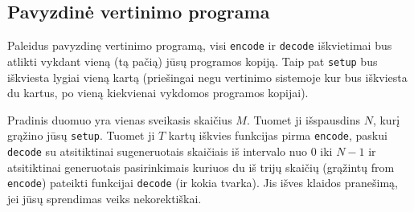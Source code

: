 \documentclass[12pt]{article}
\begin{document}
\subsection{Pavyzdinė vertinimo programa}

Paleidus pavyzdinę vertinimo programą, visi \texttt{encode} ir \texttt{decode} iškvietimai bus atlikti vykdant vieną (tą pačią) jūsų programos kopiją. Taip pat \texttt{setup} bus iškviesta lygiai vieną kartą (priešingai negu vertinimo sistemoje kur bus iškviesta du kartus, po vieną kiekvienai vykdomos programos kopijai).

Pradinis duomuo yra vienas sveikasis skaičius $M$. Tuomet ji išspausdins $N$, kurį grąžino jūsų \texttt{setup}. Tuomet ji $T$ kartų iškvies funkcijas pirma \texttt{encode}, paskui \texttt{decode} su atsitiktinai sugeneruotais skaičiais iš intervalo nuo $0$ iki $N-1$ ir atsitiktinai generuotais pasirinkimais kuriuos du iš trijų skaičių (grąžintų from \texttt{encode}) pateikti funkcijai \texttt{decode} (ir kokia tvarka). Jis išves klaidos pranešimą, jei jūsų sprendimas veiks nekorektiškai.
\end{document}
